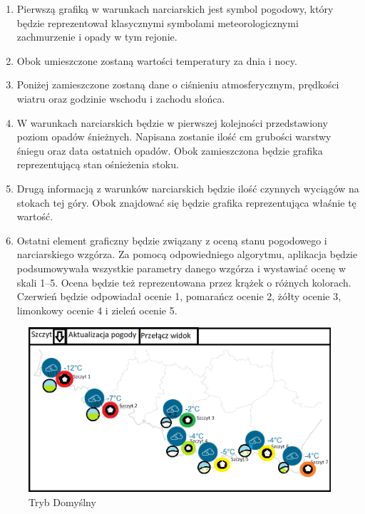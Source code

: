 \documentclass[10pt, a4paper]{article}
\begin{document}
	\begin{enumerate}
\item Pierwszą grafiką w warunkach narciarskich jest symbol pogodowy, który będzie reprezentował klasycznymi symbolami meteorologicznymi zachmurzenie i opady w tym rejonie. \\
\item Obok umieszczone zostaną wartości temperatury za dnia i nocy. \\
\item Poniżej zamieszczone zostaną dane o ciśnieniu atmosferycznym, prędkości wiatru oraz godzinie wschodu i zachodu słońca. \\
\item W warunkach narciarskich będzie w pierwszej kolejności przedstawiony poziom opadów śnieżnych. Napisana zostanie ilość cm grubości warstwy śniegu oraz data ostatnich opadów. Obok zamieszczona będzie grafika reprezentującą stan ośnieżenia stoku. \\
\item Drugą informacją z warunków narciarskich będzie ilość czynnych wyciągów na stokach tej góry. Obok znajdować się będzie grafika reprezentująca właśnie tę wartość.\\
\item Ostatni element graficzny będzie związany z oceną stanu pogodowego i narciarskiego wzgórza. Za pomocą odpowiedniego algorytmu, aplikacja będzie podsumowywała wszystkie parametry danego wzgórza i wystawiać ocenę w skali 1--5. Ocena będzie też reprezentowana przez krążek o różnych kolorach. Czerwień będzie odpowiadał ocenie 1, pomarańcz ocenie 2, żółty ocenie 3, limonkowy ocenie 4 i zieleń ocenie 5.\\
\end{enumerate}


\begin{flushleft}
	\end{flushleft}
	\begin{figure}[h]
	\centering
	\includegraphics[width=\linewidth]{menu2.png}
	\caption{Tryb Domyślny}
	\end{figure}
	
\end{document}
